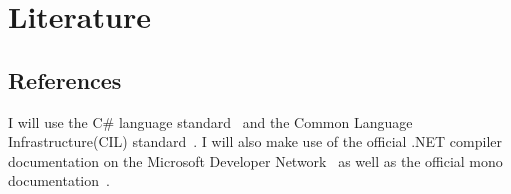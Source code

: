 \section{Literature}
\subsection{References}
I will use the C\# language standard~\cite{ecma334} and the Common Language Infrastructure(CIL) standard~\cite{ecma335}.
I will also make use of the official .NET compiler documentation on the Microsoft Developer Network~\cite{msdn} as well as the official mono documentation~\cite{mono}.
